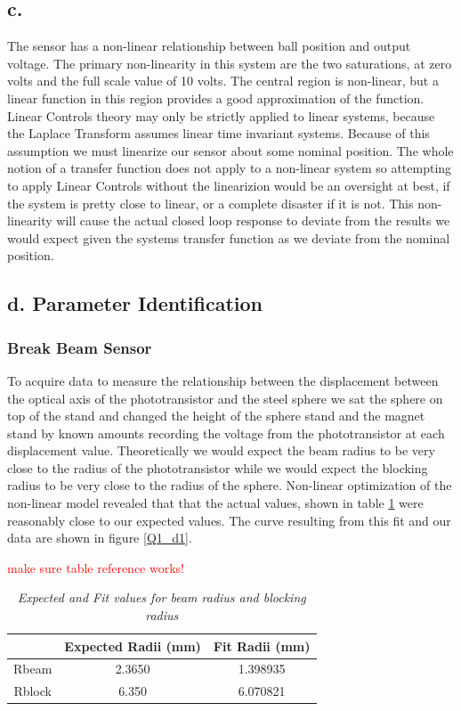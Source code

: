 \documentclass{article}
\newcommand{\xxx}[1]{\textcolor{red}{#1}}
\theoremstyle{plain}
\theoremstyle{definition}
\theoremstyle{remark}
\begin{document}
\subsection*{c.}
The sensor has a non-linear relationship between ball position and output voltage.  The primary non-linearity in this system are the two saturations, at zero volts and the full scale value of 10 volts.  The central region is non-linear, but a linear function in this region provides a good approximation of the function.  Linear Controls theory may only be strictly applied to linear systems, because the Laplace Transform assumes linear time invariant systems.  Because of this assumption we must linearize our sensor about some nominal position.  The whole notion of a transfer function does not apply to a non-linear system so attempting to apply Linear Controls without the linearizion would be an oversight at best, if the system is pretty close to linear, or a complete disaster if it is not.  This non-linearity will cause the actual closed loop response to deviate from the results we would expect given the systems transfer function as we deviate from the nominal position.

\subsection*{d. Parameter Identification}

\subsubsection*{Break Beam Sensor}
To acquire data to measure the relationship between the displacement between the optical axis of the phototransistor and the steel sphere we sat the sphere on top of the stand and changed the height of the sphere stand and the magnet stand by known amounts recording the voltage from the phototransistor at each displacement value.  Theoretically we would expect the beam radius to be very close to the radius of the phototransistor while we would expect the blocking radius to be very close to the radius of the sphere.  Non-linear optimization of the non-linear model revealed that that the actual values, shown in table \ref{Q1_dt2} were reasonably close to our expected values.  The curve resulting from this fit and our data are shown in figure \ref{Q1_d1}.

\xxx{make sure table reference works!}

\begin{table}
\begin{center}
    \begin{tabular}{|c|c|c|}
        \hline
        ~      & Expected Radii (mm) & Fit Radii (mm) \\ \hline
        Rbeam  & 2.3650              & 1.398935       \\ 
        Rblock & 6.350               & 6.070821       \\
        \hline
    \end{tabular}
\end{center}
\label{Q1_dt2}
\caption{\emph{Expected and Fit values for beam radius and blocking radius}}
\end{table}
\end{document}
